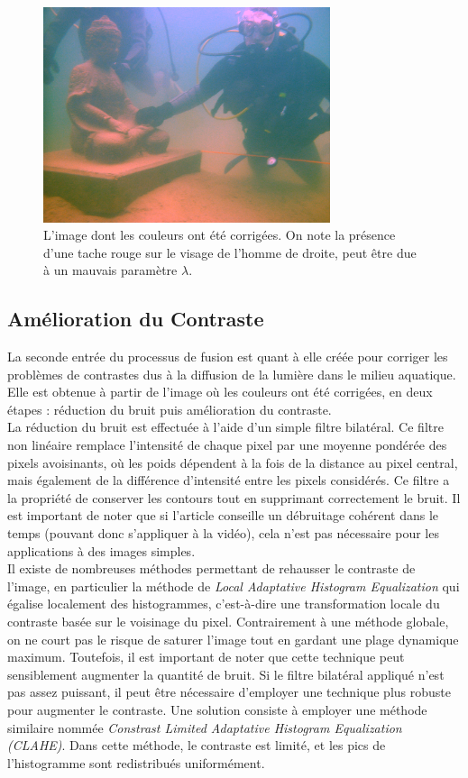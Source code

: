 \documentclass[twoside]{article}
\begin{document}
\begin{figure}[H]
  \centering
  \includegraphics[width=0.75\textwidth]{Support/color.png}
  \caption{L'image dont les couleurs ont été corrigées. On note la présence d'une tache rouge sur le visage de l'homme de droite, peut être due à un mauvais paramètre $\lambda$.}
\end{figure}

\subsection{Amélioration du Contraste}
La seconde entrée du processus de fusion est quant à elle créée pour corriger les problèmes de contrastes dus à la diffusion de la lumière dans le milieu aquatique. Elle est obtenue à partir de l'image où les couleurs ont été corrigées, en deux étapes : réduction du bruit puis amélioration du contraste.\\
La réduction du bruit est effectuée à l'aide d'un simple filtre bilatéral. Ce filtre non linéaire remplace l'intensité de chaque pixel par une moyenne pondérée des pixels avoisinants, où les poids dépendent à la fois de la distance au pixel central, mais également de la différence d'intensité entre les pixels considérés. Ce filtre a la propriété de conserver les contours tout en supprimant correctement le bruit. Il est important de noter que si l'article conseille un débruitage cohérent dans le temps (pouvant donc s'appliquer à la vidéo), cela n'est pas nécessaire pour les applications à des images simples.\\
Il existe de nombreuses méthodes permettant de rehausser le contraste de l'image, en particulier la méthode de \emph{Local Adaptative Histogram Equalization} qui égalise localement des histogrammes, c'est-à-dire une transformation locale du contraste basée sur le voisinage du pixel. Contrairement à une méthode globale, on ne court pas le risque de saturer l'image tout en gardant une plage dynamique maximum. Toutefois, il est important de noter que cette technique peut sensiblement augmenter la quantité de bruit. Si le filtre bilatéral appliqué n'est pas assez puissant, il peut être nécessaire d'employer une technique plus robuste pour augmenter le contraste. Une solution consiste à employer une méthode similaire nommée \emph{Constrast Limited Adaptative Histogram Equalization (CLAHE)}. Dans cette méthode, le contraste est limité, et les pics de l'histogramme sont redistribués uniformément.
\end{document}
